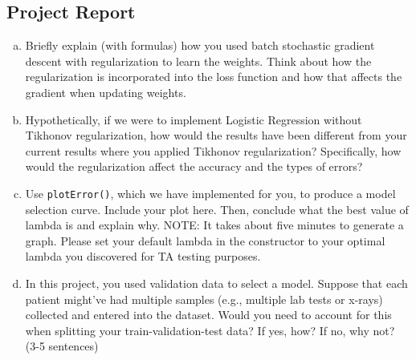 \documentclass{article}
\begin{document}
\subsection*{Project Report}
\begin{enumerate}[a.]
    \item Briefly explain (with formulas) how you used batch stochastic gradient descent with regularization to learn the weights. Think about how the regularization is incorporated into the loss function and how that affects the gradient when updating weights. 

%
%
%
%
%
%
    
    
    \item Hypothetically, if we were to implement Logistic Regression without Tikhonov regularization, how would the results have been different from your current results where you applied Tikhonov regularization? Specifically, how would the regularization affect the accuracy and the types of errors?

%
%
%
%
%
%
    
    \item Use \texttt{plotError()}, which we have implemented for you, to produce a model selection curve. Include your plot here. Then, conclude what the best value of lambda is and explain why. NOTE: It takes about five minutes to generate a graph. Please set your default lambda in the constructor to your optimal lambda you discovered for TA testing purposes. 

%
%
%
%
%
%
    
    \item In this project, you used validation data to select a model. Suppose that each patient might've had multiple samples (e.g., multiple lab tests or x-rays) collected and entered into the dataset. Would you need to account for this when splitting your train-validation-test data? If yes, how? If no, why not? (3-5 sentences)

%
%
%
%
%
%
    
\end{enumerate}
\end{document}
